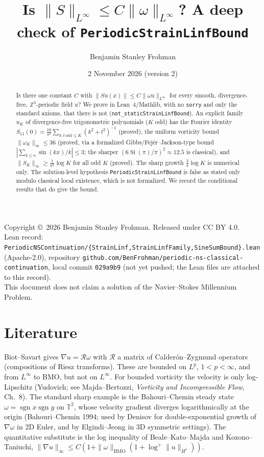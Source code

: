 \documentclass[11pt]{article}
\title{Is $\|S\|_{L^\infty}\le C\|\omega\|_{L^\infty}$? A deep check of \texttt{PeriodicStrainLinfBound}}
\author{Benjamin Stanley Frohman}
\date{2 November 2026 (version 2)}
\theoremstyle{definition}\newtheorem{definition}{Definition}
\begin{document}
\maketitle
\begin{center}Copyright \copyright\ 2026 Benjamin Stanley Frohman. Released under CC BY 4.0.\\
Lean record: \texttt{PeriodicNSContinuation/\{StrainLinf,StrainLinfFamily,SineSumBound\}.lean} (Apache-2.0), repository \texttt{github.com/BenFrohman/periodic-ns-classical-continuation}, local commit \texttt{029a9b9} (not yet pushed; the Lean files are attached to this record).\\
This document does not claim a solution of the Navier--Stokes Millennium Problem.\end{center}

\begin{abstract}
Is there one constant $C$ with $\|S u(x)\|\le C\|\omega u\|_{L^\infty}$ for every smooth, divergence-free, $\mathbb{Z}^3$-periodic field $u$? We prove in Lean~4/Mathlib, with no \texttt{sorry} and only the standard axioms, that there is not (\texttt{not\_staticStrainLinfBound}). An explicit family $u_K$ of divergence-free trigonometric polynomials ($K$ odd) has the Fourier identity $S_{11}(0)=\tfrac{16}{\pi^2}\sum_{k,l\ \mathrm{odd}\le K}(k^2+l^2)^{-1}$ (proved), the uniform vorticity bound $\|\omega_K\|_\infty\le36$ (proved, via a formalized Gibbs/Fej\'er--Jackson-type bound $|\sum_{k\le n}\sin(kx)/k|\le3$; the sharper $(6\operatorname{Si}(\pi)/\pi)^2\approx12.5$ is classical), and $\|S_K\|_\infty\ge\tfrac1{\pi^2}\log K$ for all odd $K$ (proved). The sharp growth $\tfrac2\pi\log K$ is numerical only. The solution-level hypothesis \texttt{PeriodicStrainLinfBound} is false as stated only modulo classical local existence, which is not formalized. We record the conditional results that do give the bound.
\end{abstract}

\section{Literature}
Biot--Savart gives $\nabla u=\mathcal{R}\omega$ with $\mathcal{R}$ a matrix of Calder\'on--Zygmund operators (compositions of Riesz transforms). These are bounded on $L^p$, $1<p<\infty$, and from $L^\infty$ to BMO, but not on $L^\infty$. For bounded vorticity the velocity is only log-Lipschitz (Yudovich; see Majda--Bertozzi, \emph{Vorticity and Incompressible Flow}, Ch.~8). The standard sharp example is the Bahouri--Chemin steady state $\omega=\operatorname{sgn}x\operatorname{sgn}y$ on $\mathbb{T}^2$, whose velocity gradient diverges logarithmically at the origin (Bahouri--Chemin 1994; used by Denisov for double-exponential growth of $\nabla\omega$ in 2D Euler, and by Elgindi--Jeong in 3D symmetric settings). The quantitative substitute is the log inequality of Beale--Kato--Majda and Kozono--Taniuchi, $\|\nabla u\|_\infty\le C(1+\|\omega\|_{\mathrm{BMO}}(1+\log^+\|u\|_{H^s}))$.
\end{document}
